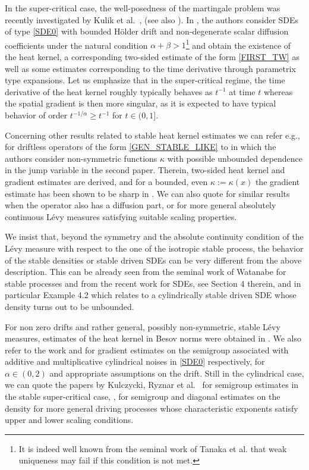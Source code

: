 \documentclass[11pt]{article}
\newcommand{\eg}{e.g.,\xspace}
\numberwithin{equation}{section}\providecommand{\asymp}{\mathrel{\sim}}
\theoremstyle{plain}
\theoremstyle{definition}
\newcommand\1{{\mathbf{1}}}
\begin{document}
In the super-critical case, the well-posedness of the martingale problem was recently investigated by
Kulik et al.\ \cite{knop:kuli:18}, \cite{kuli:19} (see also \cite{CZZ}).
In \cite{kuli:19},
the authors consider SDEs of type \eqref{SDE0} with bounded Hölder drift and non-degenerate scalar diffusion coefficients under the natural condition $\alpha+\beta>1 $\footnote{It is indeed well known from the seminal work of Tanaka et al. \cite{tana:tsuc:wata:74} that weak uniqueness may fail if this condition is not met.} and obtain the existence of the heat kernel,
a corresponding two-sided estimate of the form \eqref{FIRST_TW} as well as some estimates corresponding to the time derivative through parametrix type expansions. Let us emphasize that in the super-critical regime, the time derivative of the heat kernel roughly typically behaves as $t^{-1}$ at time $t$ whereas the spatial gradient is then more singular, as it is expected to have typical behavior of order $t^{-1/\alpha}\ge t^{-1} $ for $t\in (0,1] $.

{Concerning other results related to stable heat kernel estimates we can refer \eg for driftless operators
of the form \eqref{GEN_STABLE_LIKE} to \cite{Ch-Zh}
\cite{Ch-Zh1} in which the authors consider non-symmetric functions $\kappa$ with possible unbounded dependence in the jump variable in the second paper. Therein, two-sided heat kernel and gradient estimates are derived, and for a bounded, even $\kappa:=\kappa(x) $ the gradient estimate has been shown to be sharp in \cite{DZ}. We can also quote \cite{CHXZ} for similar results when the operator also has a diffusion part, or \cite{Ch-Zh20} for more general absolutely continuous Lévy measures satisfying suitable scaling properties.
}


{We insist that, beyond the symmetry and the absolute continuity condition of the Lévy measure with respect to the one of the isotropic stable process, the behavior of the stable densities or stable driven SDEs can be very different from the above description. This can be 	already seen from the seminal work of Watanabe \cite{wata:07} for stable processes and from the recent work \cite{knop:kuli:schi:20} for SDEs, see Section 4 therein, and in particular Example 4.2 which relates to a cylindrically stable driven SDE whose density turns out to be unbounded.
}

{
For non zero drifts and rather general, possibly non-symmetric, stable Lévy measures, estimates of the heat kernel in Besov norms were obtained in \cite{De-Fo}.
We also refer to the work \cite{kuli:pesz:prio:20} and \cite{CHZ} for gradient estimates on the semigroup associated
with additive and multiplicative cylindrical noises in \eqref{SDE0} respectively, for $\alpha\in (0,2) $ and appropriate assumptions on the drift. Still in the cylindrical case, we can quote the papers by Kulczycki, Ryznar et al.\ \cite{kulc:ryzn:szto:21} for semigroup estimates in the stable super-critical case, \cite{kulc:ryzn:19}, \cite{kulc:kuli:ryzn:21} for semigroup and diagonal estimates on the density for more general driving processes whose characteristic exponents satisfy upper and lower scaling conditions.
}
\end{document}

